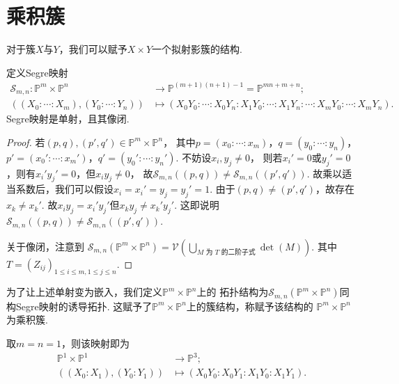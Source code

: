\section{乘积簇}
    对于簇$X$与$Y$，我们可以赋予$X \times Y$一个拟射影簇的结构.
    \begin{proposition}[Segre嵌入]
        定义Segre映射
        \begin{equation*}\begin{aligned}
            \mathcal{S}_{m,n}\colon\mathbb{P}^{m} \times \mathbb{P}^{n} &\rightarrow \mathbb{P}^{(m+1)(n+1)-1} = \mathbb{P}^{mn+m+n};\\
            ((X_{0}:\cdots:X_{m}),(Y_{0}:\cdots:Y_{n})) &\mapsto 
            (X_{0}Y_{0}:\cdots:X_{0}Y_{n}:X_{1}Y_{0}:\cdots:X_{1}Y_{n}:\cdots:X_{m}Y_{0}:\cdots:X_{m}Y_{n}). 
        \end{aligned}\end{equation*}
        Segre映射是单射，且其像闭.
    \end{proposition}
    \begin{proof}
        若$(p,q),(p',q') \in \mathbb{P}^{m} \times \mathbb{P}^{n}$，
        其中$p=(x_{0}:\cdots:x_{m})$，$q=(y_{0}:\cdots:y_{n})$，
        $p'=(x_{0}':\cdots:x_{m}')$，$q'=(y_{0}':\cdots:y_{n}')$.
        不妨设$x_{i},y_{j} \neq 0$，
        则若$x_{i}'=0$或$y_{j}'=0$，则有$x_{i}'y_{j}'=0$，但$x_{i}y_{j} \neq 0$，
        故$\mathcal{S}_{m,n}((p,q)) \neq \mathcal{S}_{m,n}((p',q'))$.
        故乘以适当系数后，我们可以假设$x_{i}=x_{i}'=y_{j}=y_{j}'=1$. 
        由于$(p,q) \neq (p',q')$，故存在$x_{k} \neq x_{k}'$.
        故$x_{i}y_{j}=x_{i}'y_{j}'$但$x_{k}y_{j} \neq x_{k}'y_{j}'$. 
        这即说明$\mathcal{S}_{m,n}((p,q)) \neq \mathcal{S}_{m,n}((p',q'))$. \par
        关于像闭，注意到
        $\mathcal{S}_{m,n}(\mathbb{P}^{m} \times \mathbb{P}^{n})=\mathcal{V}(\bigcup_{M\text{ 为 }T\text{ 的二阶子式}}\det(M))$.
        其中$T=(Z_{ij})_{1 \leq i \leq m,1\leq j \leq n}$.
    \end{proof}

    为了让上述单射变为嵌入，我们定义$\mathbb{P}^{m} \times \mathbb{P}^{n}$上的
    拓扑结构为$\mathcal{S}_{m,n}(\mathbb{P}^{m} \times \mathbb{P}^{n})$同构Segre映射的诱导拓扑.
    这赋予了$\mathbb{P}^{m} \times \mathbb{P}^{n}$上的簇结构，称赋予该结构的
    $\mathbb{P}^{m} \times \mathbb{P}^{n}$为乘积簇.

    \begin{example}
        取$m=n=1$，则该映射即为
        \begin{equation*}\begin{aligned}
            \mathbb{P}^{1} \times \mathbb{P}^{1} &\rightarrow \mathbb{P}^{3};\\
            ((X_{0}:X_{1}),(Y_{0}:Y_{1})) &\mapsto (X_{0}Y_{0}:X_{0}Y_{1}:X_{1}Y_{0}:X_{1}Y_{1}).
        \end{aligned}\end{equation*}
    \end{example}

